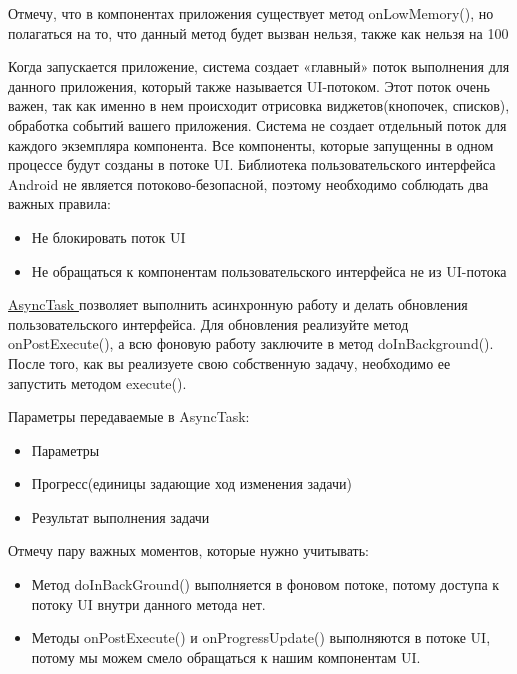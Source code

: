 Отмечу, что в компонентах приложения существует метод onLowMemory(), но полагаться на то, что данный метод будет вызван нельзя, также как нельзя на 100%

Когда запускается приложение, система создает «главный» поток выполнения для данного приложения, который также называется UI-потоком. Этот поток очень важен, так как именно в нем происходит отрисовка виджетов(кнопочек, списков), обработка событий вашего приложения. Система не создает отдельный поток для каждого экземпляра компонента. Все компоненты, которые запущенны в одном процессе будут созданы в потоке UI. Библиотека пользовательского интерфейса Android не является потоково-безопасной, поэтому необходимо соблюдать два важных правила:

\begin{itemize}
\item Не блокировать поток UI
\item Не обращаться к компонентам пользовательского интерфейса не из UI-потока
\end{itemize}

\underline{ AsyncTask } позволяет выполнить асинхронную работу и делать обновления пользовательского интерфейса.
Для обновления реализуйте метод onPostExecute(), а всю фоновую работу заключите в метод doInBackground(). После того, как вы реализуете свою собственную задачу, необходимо ее запустить методом execute().

Параметры передаваемые в AsyncTask:
\begin{itemize}
\item Параметры
\item Прогресс(единицы задающие ход изменения задачи)
\item Результат выполнения задачи
\end{itemize}

Отмечу пару важных моментов, которые нужно учитывать:
\begin{itemize}

\item Метод doInBackGround() выполняется в фоновом потоке, потому доступа к потоку UI внутри данного метода нет.
\item Методы onPostExecute() и onProgressUpdate() выполняются в потоке UI, потому мы можем смело обращаться к нашим компонентам UI.
\end{itemize}

